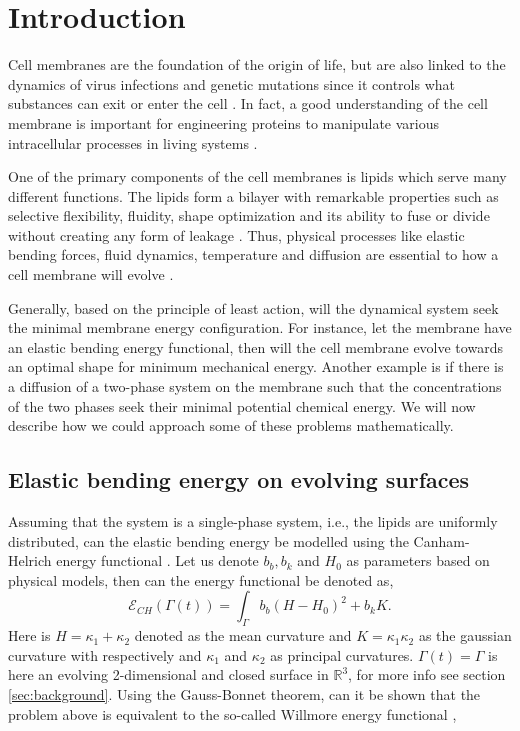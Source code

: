 \section{Introduction}\label{sec:introduction}

Cell membranes are the foundation of the origin of life, but are also linked to the dynamics of virus infections and genetic mutations since it controls what substances can exit or enter the cell \cite{nelson2008lehninger,hurley2010membrane}. In fact, a good understanding of the cell membrane is important for engineering proteins to manipulate various intracellular processes in living systems \cite{rojas1998genetic}.

One of the primary components of the cell membranes is lipids which serve many different functions. The lipids form a bilayer with remarkable properties such as selective flexibility, fluidity, shape optimization and its ability to fuse or divide without creating any form of leakage \cite{nelson2008lehninger}. Thus, physical processes like elastic
bending forces, fluid dynamics, temperature and diffusion are essential to how a cell membrane will evolve \cite{udo97,neidleman87}. 

Generally, based on the principle of least action, will the dynamical system seek the minimal membrane energy configuration. For instance, let the membrane have an elastic bending energy functional, then will the cell membrane evolve towards an optimal shape for minimum mechanical energy. Another example is if there is a diffusion of a two-phase system on the membrane such that the concentrations of the two phases seek their minimal potential chemical energy. We will now describe how we could approach some of these problems mathematically.


\subsection{Elastic bending energy on evolving surfaces}%
\label{sub:willmore_flow}

Assuming that the system is a single-phase system, i.e., the lipids are uniformly distributed, can the elastic bending energy be modelled using the Canham-Helrich energy functional \cite{helfrich1973elastic, wang08, udo97}. Let us denote $b_{b},
b_{k}$ and $H_{0}$ as parameters based on physical models, then can the energy functional be denoted as,
\begin{equation}
\label{eq:CH}
\mathcal{E} _{CH}\left( \Gamma\left( t \right)   \right) =   \int_{\Gamma  }^{}  b_{b} \left( H- H_{0} \right) ^{2} + b_{k} K
.\end{equation}
Here is $H =  \kappa_1 + \kappa_2 $ denoted as the mean curvature and $K = \kappa_1 \kappa_2$ as the gaussian curvature with respectively and $\kappa_1$ and $\kappa_2$ as principal curvatures. $\Gamma \left( t
\right) = \Gamma  $ is here an evolving 2-dimensional and closed surface in $\mathbb{R} ^3$, for more info see section \ref{sec:background}.  Using the Gauss-Bonnet theorem, can it be shown that the problem above is equivalent to the so-called Willmore energy
functional \cite{montiel2009curves, willmore1996riemannian},


